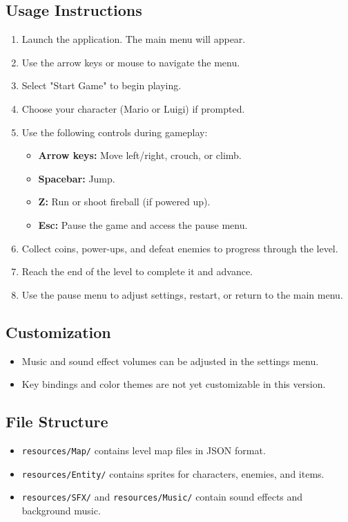 \subsection{Usage Instructions}
\begin{enumerate}
    \item Launch the application. The main menu will appear.
    \item Use the arrow keys or mouse to navigate the menu.
    \item Select "Start Game" to begin playing.
    \item Choose your character (Mario or Luigi) if prompted.
    \item Use the following controls during gameplay:
    \begin{itemize}
        \item \textbf{Arrow keys:} Move left/right, crouch, or climb.
        \item \textbf{Spacebar:} Jump.
        \item \textbf{Z:} Run or shoot fireball (if powered up).
        \item \textbf{Esc:} Pause the game and access the pause menu.
    \end{itemize}
    \item Collect coins, power-ups, and defeat enemies to progress through the level.
    \item Reach the end of the level to complete it and advance.
    \item Use the pause menu to adjust settings, restart, or return to the main menu.
\end{enumerate}

\vspace{1em}

\subsection{Customization}
\begin{itemize}
    \item Music and sound effect volumes can be adjusted in the settings menu.
    \item Key bindings and color themes are not yet customizable in this version.
\end{itemize}

\subsection{File Structure}
\begin{itemize}
    \item \texttt{resources/Map/} contains level map files in JSON format.
    \item \texttt{resources/Entity/} contains sprites for characters, enemies, and items.
    \item \texttt{resources/SFX/} and \texttt{resources/Music/} contain sound effects and background music.
\end{itemize}

